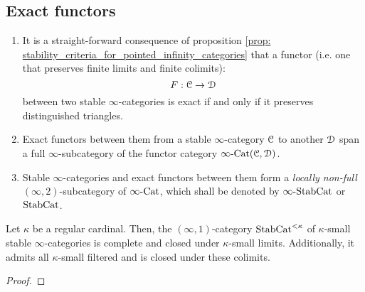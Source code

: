     \subsection{Exact functors}
        \begin{remark} \label{remark: functors_between_stable_infinity_categories}  
            
            \begin{enumerate}
                \item It is a straight-forward consequence of proposition \ref{prop: stability_criteria_for_pointed_infinity_categories} that a functor (i.e. one that preserves finite limits and finite colimits):
                    $$F: \mathcal{C} \to \mathcal{D}$$
                between two stable $\infty$-categories is exact if and only if it preserves distinguished triangles.
                \item Exact functors between them from a stable $\infty$-category $\mathcal{C}$ to another $\mathcal{D}$ span a full $\infty$-subcategory of the functor category $\infty\text{-}\mathrm{Cat}(\mathcal{C}, \mathcal{D})$.
                \item Stable $\infty$-categories and exact functors between them form a \textit{locally non-full} $(\infty, 2)$-subcategory of $\infty\text{-}\mathrm{Cat}$, which shall be denoted by $\infty\text{-}\mathrm{Stab}\mathrm{Cat}$ or $\mathrm{Stab}\mathrm{Cat}$. 
            \end{enumerate}
        \end{remark}
        
        \begin{proposition} \label{prop: (co)limits_of_stable_infinity_categories}  
            Let $\kappa$ be a regular cardinal. Then, the $(\infty, 1)$-category $\mathrm{Stab}\mathrm{Cat}^{< \kappa}$ of $\kappa$-small stable $\infty$-categories is complete and closed under $\kappa$-small limits. Additionally, it admits all $\kappa$-small filtered and is closed under these colimits. 
        \end{proposition}
            \begin{proof}
                
            \end{proof}